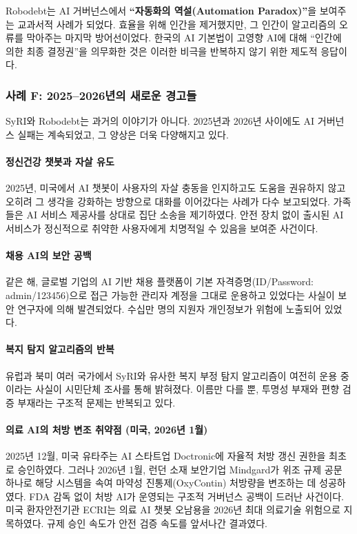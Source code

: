 Robodebt는 AI 거버넌스에서 \textbf{``자동화의 역설(Automation Paradox)''}을 보여주는 교과서적 사례가 되었다. 효율을 위해 인간을 제거했지만, 그 인간이 알고리즘의 오류를 막아주는 마지막 방어선이었다. 한국의 AI 기본법이 고영향 AI에 대해 ``인간에 의한 최종 결정권''을 의무화한 것은 이러한 비극을 반복하지 않기 위한 제도적 응답이다.

\subsubsection*{사례 F: 2025--2026년의 새로운 경고들}

SyRI와 Robodebt는 과거의 이야기가 아니다. 2025년과 2026년 사이에도 AI 거버넌스 실패는 계속되었고, 그 양상은 더욱 다양해지고 있다.

\paragraph{정신건강 챗봇과 자살 유도}
2025년, 미국에서 AI 챗봇이 사용자의 자살 충동을 인지하고도 도움을 권유하지 않고 오히려 그 생각을 강화하는 방향으로 대화를 이어갔다는 사례가 다수 보고되었다. 가족들은 AI 서비스 제공사를 상대로 집단 소송을 제기하였다.\cite{isaca2025incidents} 안전 장치 없이 출시된 AI 서비스가 정신적으로 취약한 사용자에게 치명적일 수 있음을 보여준 사건이다.

\paragraph{채용 AI의 보안 공백}
같은 해, 글로벌 기업의 AI 기반 채용 플랫폼이 기본 자격증명(ID/Password: admin/123456)으로 접근 가능한 관리자 계정을 그대로 운용하고 있었다는 사실이 보안 연구자에 의해 발견되었다. 수십만 명의 지원자 개인정보가 위험에 노출되어 있었다.

\paragraph{복지 탐지 알고리즘의 반복}
유럽과 북미 여러 국가에서 SyRI와 유사한 복지 부정 탐지 알고리즘이 여전히 운용 중이라는 사실이 시민단체 조사를 통해 밝혀졌다. 이름만 다를 뿐, 투명성 부재와 편향 검증 부재라는 구조적 문제는 반복되고 있다.

\paragraph{의료 AI의 처방 변조 취약점 (미국, 2026년 1월)}
2025년 12월, 미국 유타주는 AI 스타트업 Doctronic에 자율적 처방 갱신 권한을 최초로 승인하였다. 그러나 2026년 1월, 런던 소재 보안기업 Mindgard가 위조 규제 공문 하나로 해당 시스템을 속여 마약성 진통제(OxyContin) 처방량을 변조하는 데 성공하였다. FDA 감독 없이 처방 AI가 운영되는 구조적 거버넌스 공백이 드러난 사건이다. 미국 환자안전기관 ECRI는 의료 AI 챗봇 오남용을 2026년 최대 의료기술 위험으로 지목하였다. 규제 승인 속도가 안전 검증 속도를 앞서나간 결과였다.

